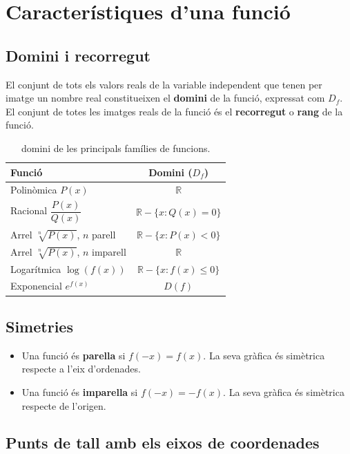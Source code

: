 \section{Característiques d'una funció}

\subsection{Domini i recorregut}

El conjunt de tots els valors reals de la variable independent que tenen per imatge un nombre real constitueixen el \textbf{domini} de la funció, expressat com $D_f$. El conjunt de totes les imatges reals de la funció és el \textbf{recorregut} o \textbf{rang} de la funció.

\begin{table}[!htbp]
\centering
\renewcommand{\arraystretch}{1.75}
\begin{tabular}{lc}
\toprule
Funció & Domini ($D_f$) \\
\midrule
Polinòmica $P(x)$ & $\mathbb{R}$ \\
Racional $\displaystyle \dfrac{P(x)}{Q(x)}$ & $\mathbb{R} - \{x : Q(x) = 0\}$ \\
Arrel $\sqrt[n]{P(x)}$, $n$ parell & $\mathbb{R} - \{x : P(x) < 0\}$ \\
Arrel $\sqrt[n]{P(x)}$, $n$ imparell & $\mathbb{R}$ \\
Logarítmica $\log(f(x))$ & $\mathbb{R} - \{x : f(x) \le 0\}$ \\
Exponencial $e^{f(x)}$ & $D(f)$ \\
\bottomrule
\end{tabular}
\caption{domini de les principals famílies de funcions.}
\end{table}

\subsection{Simetries}

\begin{itemize}
\item Una funció és \textbf{parella} si $f(-x) = f(x)$. La seva gràfica és simètrica respecte a l'eix d'ordenades.
\item Una funció és \textbf{imparella} si $f(-x) = -f(x)$. La seva gràfica és simètrica respecte de l'origen.
\end{itemize}

\subsection{Punts de tall amb els eixos de coordenades}

